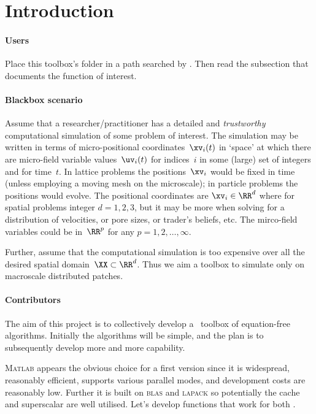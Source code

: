 \section{Introduction}
\secttoc

\paragraph{Users}
Place this toolbox's folder in a path searched by \script.
Then read the subsection that documents the function of interest.


\paragraph{Blackbox scenario}
Assume that a researcher\slash practitioner has a detailed and \emph{trustworthy} computational simulation of some problem of interest.
The simulation may be written in terms of micro-positional coordinates~\(\xv_i(t)\) in `space' at which there are micro-field variable values~\(\uv_i(t)\) for indices~\(i\) in some (large) set of integers and for time~\(t\).
In lattice problems the positions~\(\xv_i\) would be fixed in time (unless employing a moving mesh on the microscale); in particle problems the positions would evolve.
The positional coordinates are \(\xv_i\in\RR^{d}\) where for spatial problems integer \(d=1,2,3\), but it may be more when solving for a distribution of velocities, or pore sizes, or trader's beliefs, etc.
The mirco-field variables could be in~\(\RR^{p}\) for any \(p=1,2,\ldots,\infty\).

Further, assume that the computational simulation is too expensive over all the desired spatial domain~\(\XX\subset\RR^{d}\).
Thus we aim a toolbox to simulate only on macroscale distributed patches.



\paragraph{Contributors}
The aim of this project is to collectively develop a \script\ toolbox of equation-free algorithms.
Initially the algorithms will be simple, and the plan is to subsequently develop more and more capability.

\textsc{Matlab} appears the obvious choice for a first version since it is widespread, reasonably efficient, supports various parallel modes, and development costs are reasonably low.
Further it is built on \textsc{blas} and \textsc{lapack} so potentially the cache and superscalar \cpu{} are well utilised.
Let's develop functions that work for both \script.




